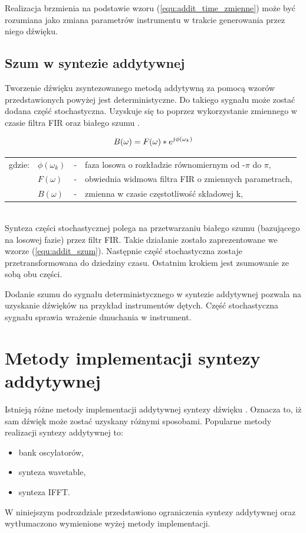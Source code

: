 Realizacja brzmienia na podstawie wzoru (\ref{equ:addit_time_zmienne}) może być rozumiana jako zmiana parametrów instrumentu w trakcie generowania przez niego dźwięku.

\subsection{Szum w syntezie addytywnej}
Tworzenie dźwięku zsyntezowanego metodą addytywną za pomocą wzorów przedstawionych powyżej jest deterministyczne. Do takiego sygnału może zostać dodana część stochastyczna. Uzyskuje się to poprzez wykorzystanie zmiennego w czasie filtra FIR oraz białego szumu \cite{add_szum}.

\begin{equation} \label{equ:addit_szum}
B(\omega) = F(\omega)*e^{j\phi(\omega_{k})} \\  
\end{equation}
\begin{tabular}{ l l l l}
	gdzie: & $\phi(\omega_{k})$ &  - & faza losowa o rozkładzie równomiernym od -$\pi$ do $\pi$, \\
	& $F(\omega)$ &  - & obwiednia widmowa filtra FIR o zmiennych parametrach, \\
	&	$B(\omega)$ & - & zmienna w czasie częstotliwość składowej k, \\
\end{tabular} \\

Synteza części stochastycznej polega na przetwarzaniu białego szumu (bazującego na losowej fazie) przez filtr FIR. Takie działanie zostało zaprezentowane we wzorze (\ref{equ:addit_szum}). Następnie część stochastyczna zostaje przetransformowana do dziedziny czasu. Ostatnim krokiem jest zsumowanie ze sobą obu części.

Dodanie szumu do sygnału deterministycznego w syntezie addytywnej pozwala na uzyskanie dźwięków na przykład instrumentów dętych. Część stochastyczna sygnału sprawia wrażenie dmuchania w instrument.


\section{Metody implementacji syntezy addytywnej}
Istnieją różne metody implementacji addytywnej syntezy dźwięku \cite{add_imp_meth}. Oznacza to, iż sam dźwięk może zostać uzyskany różnymi sposobami. Popularne metody realizacji syntezy addytywnej to:
\begin{itemize}
	\item bank oscylatorów,
	\item synteza wavetable,
	\item synteza IFFT.
\end{itemize}
W niniejszym podrozdziale przedstawiono ograniczenia syntezy addytywnej oraz wytłumaczono wymienione wyżej metody implementacji.

